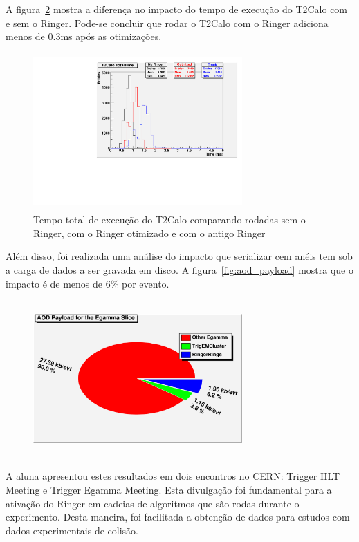 \documentclass[a4paper,10pt,titlepage]{article}
\begin{document}
A figura~\ref{fig:egamma_ringer_time_optimization} mostra a diferença no impacto do tempo de execução do T2Calo com e sem o Ringer.
Pode-se concluir que rodar o T2Calo com o Ringer adiciona menos de 0.3ms após as otimizações.

\begin{figure}[htbp!]
 \centering
 \includegraphics[width=8cm,height=6cm]{Figs/egamma_refactoring/egamma_ringer_time_optimization.pdf}
 \caption{Tempo total de execução do T2Calo comparando rodadas sem o Ringer, com o Ringer otimizado e com o antigo Ringer}
 \label{fig:egamma_ringer_time_optimization}
\end{figure}

Além disso, foi realizada uma análise do impacto que serializar cem anéis tem sob a carga de dados a ser gravada em disco.
A figura~\ref{fig:aod_payload} mostra que o impacto é de menos de 6\% por evento.

\begin{figure}[htbp!]
 \centering
 \includegraphics[width=8cm,height=6cm]{Figs/egamma_refactoring/aod_payload.png}
 \caption{}
 \label{fig:egamma_ringer_time_optimization}
\end{figure}

A aluna apresentou estes resultados em dois encontros no CERN: Trigger HLT Meeting e Trigger Egamma Meeting.
Esta divulgação foi fundamental para a ativação do Ringer em cadeias de algoritmos que são rodas durante o experimento.
Desta maneira, foi facilitada a obtenção de dados para estudos com dados experimentais de colisão.
\end{document}
